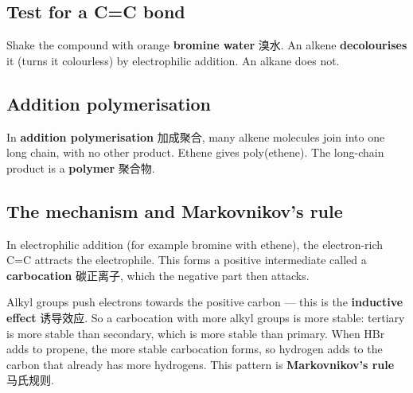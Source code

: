 \documentclass[11pt]{article}
\begin{document}
\subsection*{Test for a C=C bond}

Shake the compound with orange \textbf{bromine water} 溴水. An alkene \textbf{decolourises} it (turns it colourless) by electrophilic addition. An alkane does not.

\subsection*{Addition polymerisation}

In \textbf{addition polymerisation} 加成聚合, many alkene molecules join into one long chain, with no other product. Ethene gives poly(ethene). The long-chain product is a \textbf{polymer} 聚合物.

\subsection*{The mechanism and Markovnikov's rule}

In electrophilic addition (for example bromine with ethene), the electron-rich C=C attracts the electrophile. This forms a positive intermediate called a \textbf{carbocation} 碳正离子, which the negative part then attacks.

Alkyl groups push electrons towards the positive carbon — this is the \textbf{inductive effect} 诱导效应. So a carbocation with more alkyl groups is more stable: tertiary is more stable than secondary, which is more stable than primary. When $\text{HBr}$ adds to propene, the more stable carbocation forms, so hydrogen adds to the carbon that already has more hydrogens. This pattern is \textbf{Markovnikov's rule} 马氏规则.
\end{document}
